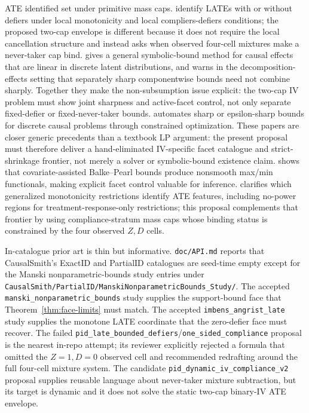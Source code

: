 \documentclass[11pt]{article}
\theoremstyle{definition}
\theoremstyle{plain}
\theoremstyle{remark}
\begin{document}
ATE identified set under primitive mass caps.  \citet{DahlHuberMellace2023}
identify LATEs with or without defiers under local monotonicity and local
compliers-defiers conditions; the proposed two-cap envelope is different
because it does not require the local cancellation structure and instead asks
when observed four-cell mixtures make a never-taker cap bind.
\citet{SachsJonzonSjolanderGabriel2023} gives a general symbolic-bound method
for causal effects that are linear in discrete latent distributions, and
\citet{GabrielSachsSjolander2023} warns in the decomposition-effects setting
that separately sharp componentwise bounds need not combine sharply.  Together
they make the non-subsumption issue explicit: the two-cap IV problem must show
joint sharpness and active-facet control, not only separate fixed-defier or
fixed-never-taker bounds.  \citet{DuarteFinkelsteinKnoxMummoloShpitser2024}
automates sharp or epsilon-sharp bounds for discrete causal problems through
constrained optimization.
These papers are closer generic precedents than a textbook LP
argument: the present proposal must therefore deliver a hand-eliminated
IV-specific facet catalogue and strict-shrinkage frontier, not merely a solver
or symbolic-bound existence claim.  \citet{LevisBonviniZengKeeleKennedy2025}
shows that covariate-assisted Balke--Pearl bounds produce nonsmooth max/min
functionals, making explicit facet control valuable for inference.  \citet{BaiHuangMoonShaikhVytlacil2024}
clarifies which generalized monotonicity restrictions identify ATE features,
including no-power regions for treatment-response-only restrictions; this
proposal complements that frontier by using compliance-stratum mass caps whose
binding status is constrained by the four observed \(Z,D\) cells.

In-catalogue prior art is thin but informative.  \texttt{doc/API.md} reports
that CausalSmith's ExactID and PartialID catalogues are seed-time empty except
for the Manski nonparametric-bounds study entries under
\texttt{CausalSmith/PartialID/ManskiNonparametricBounds\_Study/}.  The accepted
\texttt{manski\_nonparametric\_bounds} study supplies the support-bound face
that Theorem~\ref{thm:face-limits} must match.  The accepted
\texttt{imbens\_angrist\_late} study supplies the monotone LATE coordinate that
the zero-defier face must recover.  The failed
\texttt{pid\_late\_bounded\_defiers}/\texttt{one\_sided\_compliance} proposal is
the nearest in-repo attempt; its reviewer explicitly rejected a formula that
omitted the \(Z=1,D=0\) observed cell and recommended redrafting around the full
four-cell mixture system.  The candidate
\texttt{pid\_dynamic\_iv\_compliance\_v2} proposal supplies reusable language
about never-taker mixture subtraction, but its target is dynamic and it does
not solve the static two-cap binary-IV ATE envelope.
\end{document}
